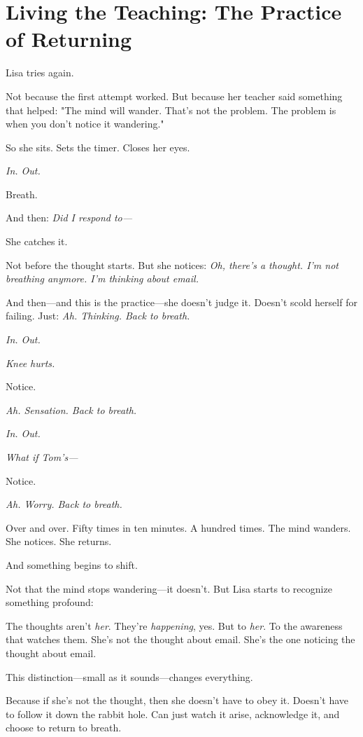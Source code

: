 \documentclass[11pt,twoside]{book}
\begin{document}
\section*{Living the Teaching: The Practice of Returning}

Lisa tries again.

Not because the first attempt worked. But because her teacher said something that helped: "The mind will wander. That's not the problem. The problem is when you don't notice it wandering."

So she sits. Sets the timer. Closes her eyes.

\emph{In. Out.}

Breath.

And then: \emph{Did I respond to—}

She catches it.

Not before the thought starts. But she notices: \emph{Oh, there's a thought. I'm not breathing anymore. I'm thinking about email.}

And then—and this is the practice—she doesn't judge it. Doesn't scold herself for failing. Just: \emph{Ah. Thinking. Back to breath.}

\emph{In. Out.}

\emph{Knee hurts.}

Notice.

\emph{Ah. Sensation. Back to breath.}

\emph{In. Out.}

\emph{What if Tom's—}

Notice.

\emph{Ah. Worry. Back to breath.}

Over and over. Fifty times in ten minutes. A hundred times. The mind wanders. She notices. She returns.

And something begins to shift.

Not that the mind stops wandering—it doesn't. But Lisa starts to recognize something profound:

The thoughts aren't \emph{her}. They're \emph{happening}, yes. But to \emph{her}. To the awareness that watches them. She's not the thought about email. She's the one noticing the thought about email.

This distinction—small as it sounds—changes everything.

Because if she's not the thought, then she doesn't have to obey it. Doesn't have to follow it down the rabbit hole. Can just watch it arise, acknowledge it, and choose to return to breath.
\end{document}
